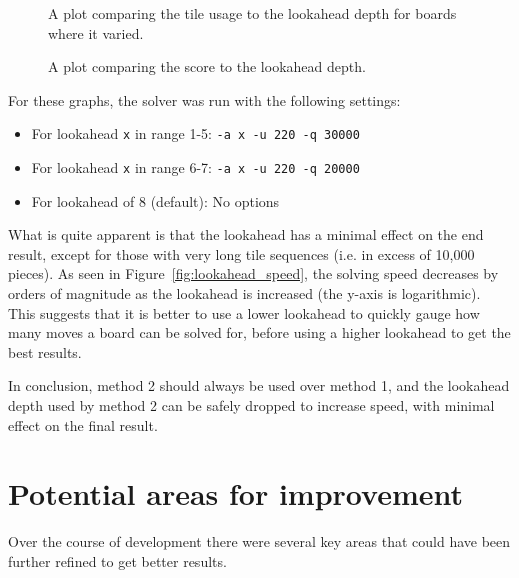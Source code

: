\documentclass[a4paper, 11pt, titlepage]{report}
\begin{document}
\begin{figure}[H]
	\centering
	\caption{A plot comparing the tile usage to the lookahead depth for boards where it varied.}
	\label{fig:lookahead_tileusage}
\end{figure}

\begin{figure}[H]
	\centering
	\caption{A plot comparing the score to the lookahead depth.}
	\label{fig:lookahead_score}
\end{figure}

For these graphs, the solver was run with the following settings:
\begin{itemize}
	\singlespacing
	\item For lookahead \texttt{x} in range 1-5: \texttt{-a x -u 220 -q 30000}
	\item For lookahead \texttt{x} in range 6-7: \texttt{-a x -u 220 -q 20000}
	\item For lookahead of 8 (default): No options
	\onehalfspacing
\end{itemize}

What is quite apparent is that the lookahead has a minimal effect on the end result, except for those with very long tile sequences (i.e. in excess of 10,000 pieces). As seen in Figure~\ref{fig:lookahead_speed}, the solving speed decreases by orders of magnitude as the lookahead is increased (the y-axis is logarithmic). This suggests that it is better to use a lower lookahead to quickly gauge how many moves a board can be solved for, before using a higher lookahead to get the best results. 

In conclusion, method 2 should always be used over method 1, and the lookahead depth used by method 2 can be safely dropped to increase speed, with minimal effect on the final result. 

\chapter{Potential areas for improvement}
Over the course of development there were several key areas that could have been further refined to get better results.
\end{document}
